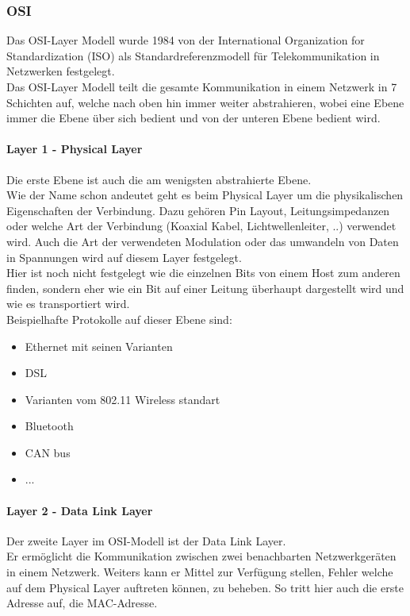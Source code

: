 \documentclass[11pt,a4paper]{report}
\begin{document}
\subsubsection{OSI}
Das OSI-Layer Modell wurde 1984 von der International Organization for Standardization (ISO) als Standardreferenzmodell für Telekommunikation in Netzwerken festgelegt.\\
Das OSI-Layer Modell teilt die gesamte Kommunikation in einem Netzwerk in 7 Schichten auf, welche nach oben hin immer weiter abstrahieren, wobei eine Ebene immer die Ebene über sich bedient und von der unteren Ebene bedient wird.\\
\paragraph{Layer 1 - Physical Layer}
Die erste Ebene ist auch die am wenigsten abstrahierte Ebene.\\
Wie der Name schon andeutet geht es beim Physical Layer um die physikalischen Eigenschaften der Verbindung. Dazu gehören Pin Layout, Leitungsimpedanzen oder welche Art der Verbindung (Koaxial Kabel, Lichtwellenleiter, ..) verwendet wird. Auch die Art der verwendeten Modulation oder das umwandeln von Daten in Spannungen wird auf diesem Layer festgelegt.\\ Hier ist noch nicht festgelegt wie die einzelnen Bits von einem Host zum anderen finden, sondern eher wie ein Bit auf einer Leitung überhaupt dargestellt wird und wie es transportiert wird.\\

Beispielhafte Protokolle auf dieser Ebene sind:
\begin{itemize}
\item Ethernet mit seinen Varianten
\item DSL 
\item Varianten vom 802.11 Wireless standart
\item Bluetooth
\item CAN bus
\item ...
\end{itemize}
\paragraph{Layer 2 - Data Link Layer}
Der zweite Layer im OSI-Modell ist der Data Link Layer.\\
Er ermöglicht die Kommunikation zwischen zwei benachbarten Netzwerkgeräten in einem Netzwerk. Weiters kann er Mittel zur Verfügung stellen, Fehler welche auf dem Physical Layer auftreten können, zu beheben. So tritt hier auch die erste Adresse auf, die MAC-Adresse.\\
\end{document}
